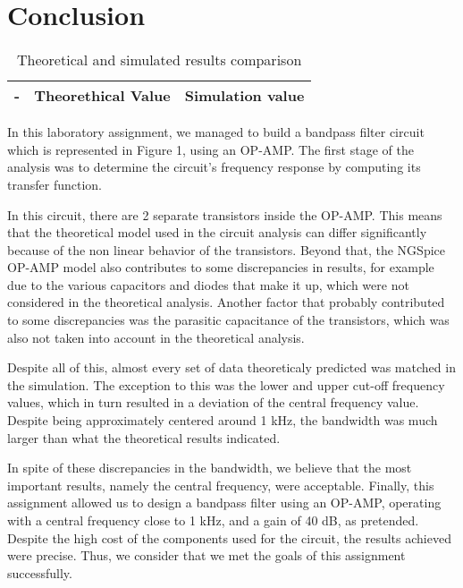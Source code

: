 \section{Conclusion}
\label{sec:conclusion}
\par
\begin{table}[!h]
  \centering
  \begin{tabular}{c c c}
    \hline    
    {\bf -} & {\bf Theorethical Value} & {\bf Simulation value}\\ \hline
     
  \end{tabular}
  \caption{Theoretical and simulated results comparison}
  \label{tab:comp}
\end{table}

In this laboratory assignment, we managed to build a bandpass filter circuit which is represented in Figure 1, using an OP-AMP. The first stage of the analysis was to determine the circuit's frequency response by computing its transfer function.

In this circuit, there are 2 separate transistors inside the OP-AMP. This means that the theoretical model used in the circuit analysis can differ significantly because of the non linear behavior of the transistors. Beyond that, the NGSpice OP-AMP model also contributes to some discrepancies in results, for example due to the various capacitors and diodes that make it up, which were not considered in the theoretical analysis.
Another factor that probably contributed to some discrepancies was the parasitic capacitance of the transistors, which was also not taken into account in the theoretical analysis. 

Despite all of this, almost every set of data theoreticaly predicted was matched in the simulation. The exception to this was the lower and upper cut-off frequency values, which in turn resulted in a deviation of the central frequency value.   
Despite being approximately centered around 1 kHz, the bandwidth was much larger than what the theoretical results indicated. 

In spite of these discrepancies in the bandwidth, we believe that the most important results, namely the central frequency, were acceptable. 
Finally, this assignment allowed us to design a bandpass filter using an OP-AMP, operating with a central frequency close to 1 kHz, and a gain of 40 dB, as pretended. Despite the high cost of the components used for the circuit, the results achieved were precise. Thus, we consider that we met the goals of this assignment successfully.






